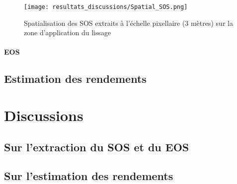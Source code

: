 \begin{figure}[htbp]
 \begin{center}
  \texttt{[image: resultats\_discussions/Spatial\_SOS.png]} 
 \end{center}
 \caption[Spatialisation des SOS]{Spatialisation des SOS extraits à l'échelle pixellaire (3 mètres) sur la zone d'application du lissage}
 \label{fig-spatial-sos}
\end{figure}

\paragraph{EOS}

\subsection{Estimation des rendements}
  
\section{Discussions}

\subsection{Sur l'extraction du SOS et du EOS}

\subsection{Sur l'estimation des rendements}
